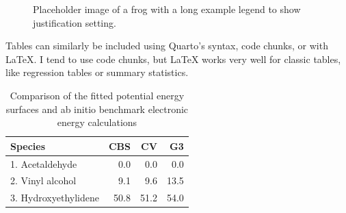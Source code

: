 \documentclass[
  9pt,
  twocolumn,
  twoside]{pnas-new}
\begin{document}
\begin{figure}


\caption{\label{fig-frog}Placeholder image of a frog with a long example
legend to show justification setting.}

\end{figure}%

Tables can similarly be included using Quarto's syntax, code chunks, or
with LaTeX. I tend to use code chunks, but LaTeX works very well for
classic tables, like regression tables or summary statistics.

\begin{table}[t!]
\centering
\caption{Comparison of the fitted potential energy surfaces and ab initio benchmark electronic energy calculations}
\begin{tabular}{lrrr}
Species & CBS & CV & G3 \\
\midrule
1. Acetaldehyde & 0.0 & 0.0 & 0.0 \\
2. Vinyl alcohol & 9.1 & 9.6 & 13.5 \\
3. Hydroxyethylidene & 50.8 & 51.2 & 54.0\\
\bottomrule
\end{tabular}

\end{table}
\end{document}
